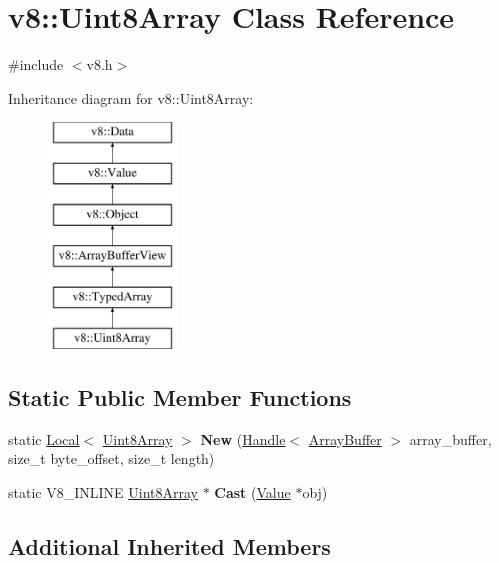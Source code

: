 \hypertarget{classv8_1_1Uint8Array}{}\section{v8\+:\+:Uint8\+Array Class Reference}
\label{classv8_1_1Uint8Array}


{\ttfamily \#include $<$v8.\+h$>$}

Inheritance diagram for v8\+:\+:Uint8\+Array\+:\begin{figure}[H]
\begin{center}
\leavevmode
\includegraphics[height=6.000000cm]{classv8_1_1Uint8Array}
\end{center}
\end{figure}
\subsection*{Static Public Member Functions}
\begin{DoxyCompactItemize}
\item 
\hypertarget{classv8_1_1Uint8Array_a6033f331f7d059456bf871d3a8e8da44}{}static \hyperlink{classv8_1_1Local}{Local}$<$ \hyperlink{classv8_1_1Uint8Array}{Uint8\+Array} $>$ {\bfseries New} (\hyperlink{classv8_1_1Handle}{Handle}$<$ \hyperlink{classv8_1_1ArrayBuffer}{Array\+Buffer} $>$ array\+\_\+buffer, size\+\_\+t byte\+\_\+offset, size\+\_\+t length)\label{classv8_1_1Uint8Array_a6033f331f7d059456bf871d3a8e8da44}

\item 
\hypertarget{classv8_1_1Uint8Array_a3bf7e458abe0be9bc943ba2de6c4f432}{}static V8\+\_\+\+I\+N\+L\+I\+N\+E \hyperlink{classv8_1_1Uint8Array}{Uint8\+Array} $\ast$ {\bfseries Cast} (\hyperlink{classv8_1_1Value}{Value} $\ast$obj)\label{classv8_1_1Uint8Array_a3bf7e458abe0be9bc943ba2de6c4f432}

\end{DoxyCompactItemize}
\subsection*{Additional Inherited Members}


